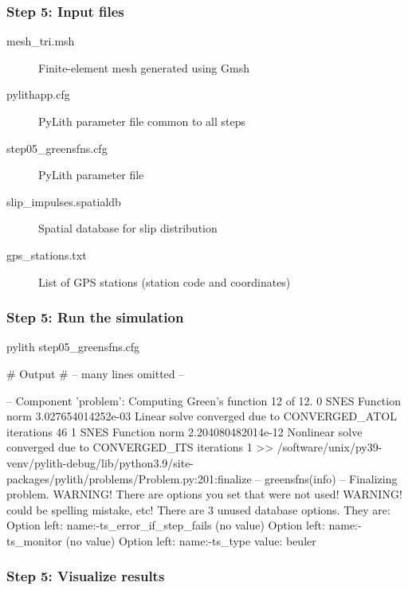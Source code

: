 \documentclass{beamer}
\begin{document}
\begin{frame}
  \frametitle{Step 5: Input files}
  \summary{}

  \begin{description}
  \item[mesh\_tri.msh] Finite-element mesh generated using Gmsh
  \item[pylithapp.cfg] PyLith parameter file common to all steps
  \item[step05\_greensfns.cfg] PyLith parameter file
  \item[slip\_impulses.spatialdb] Spatial database for slip distribution
  \item[gps\_stations.txt] List of GPS stations (station code and coordinates)
  \end{description}
    
\end{frame}


\begin{frame}[fragile]
  \frametitle{Step 5: Run the simulation}
  \summary{}

\begin{bashcode}
pylith step05_greensfns.cfg

# Output
# -- many lines omitted --

 -- Component 'problem': Computing Green's function 12 of 12.
  0 SNES Function norm 3.027654014252e-03
  Linear solve converged due to CONVERGED_ATOL iterations 46
  1 SNES Function norm 2.204080482014e-12
Nonlinear solve converged due to CONVERGED_ITS iterations 1
 >> /software/unix/py39-venv/pylith-debug/lib/python3.9/site-packages/pylith/problems/Problem.py:201:finalize
 -- greensfns(info)
 -- Finalizing problem.
WARNING! There are options you set that were not used!
WARNING! could be spelling mistake, etc!
There are 3 unused database options. They are:
Option left: name:-ts_error_if_step_fails (no value)
Option left: name:-ts_monitor (no value)
Option left: name:-ts_type value: beuler
\end{bashcode}
  
\end{frame}


\begin{frame}
  \frametitle{Step 5: Visualize results}

    
\end{frame}
\end{document}
